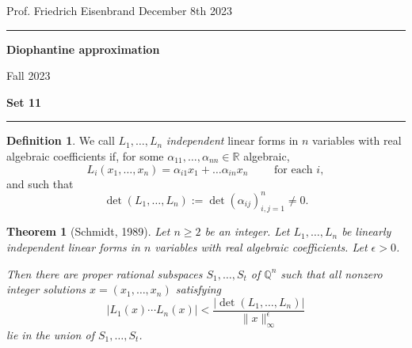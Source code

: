 \documentclass[12pt,a4paper]{article}
\date{}
\theoremstyle{plain}
\newtheorem{theorem}{Theorem}
\newtheorem*{Sol*}{Solution}
\theoremstyle{definition}
\newtheorem{Ex}{Exercise}
\newtheorem{definition}{Definition}
\def \Q {\mathbb Q}
\def \R {\mathbb R}
\newif\ifsolutions
\newcommand{\exercise}[2]{
			\begin{Ex} #1 \end{Ex}
			\ifsolutions  \begin{Sol*} #2 \end{Sol*} \bigskip \else \bigskip  \fi
		}
\begin{document}
\begin{center}
{Prof. Friedrich Eisenbrand \hfill December 8th 2023}
\end{center}
	
\hrule\vspace{\baselineskip}

\begin{center}
\textbf{Diophantine approximation}

Fall 2023

\bigskip

\textbf{Set 11}
\ifsolutions{\textbf{- Solutions}} \else{} \fi
\end{center}

\hrule\vspace{\baselineskip}




\begin{definition}
	We call $L_1, \dots, L_n$ \emph{independent} linear forms in $n$ variables with real algebraic coefficients if, for some $\alpha_{11}, \dots, \alpha_{nn} \in \R$ algebraic,
		\[ L_i(x_1, \dots, x_n) = \alpha_{i1} x_1 + \dots \alpha_{in} x_n \qquad \text{ for each $i$},\]
	and such that
		\[ \det(L_1, \dots, L_n) := \det \left( \alpha_{ij} \right)_{i,j=1}^n \neq 0. \]
	
\end{definition}

\begin{theorem}[Schmidt, 1989]

	Let $n \geq 2$ be an integer.
	Let $L_1, \dots, L_n$ be linearly independent linear forms in $n$ variables with real algebraic coefficients.
	Let $\epsilon > 0$.

	Then there are proper rational subspaces $S_1, \dots, S_t$ of $\Q^n$
	such that all nonzero integer solutions $x = (x_1, \dots, x_n)$ satisfying 
		\[ \left| L_1(x) \cdots L_n(x) \right| < \frac{ \left| \det(L_1, \dots, L_n) \right|  }{\| x\|_\infty^{\epsilon}} \]
	lie in the union of $S_1, \dots, S_t$.

\end{theorem}
\end{document}
